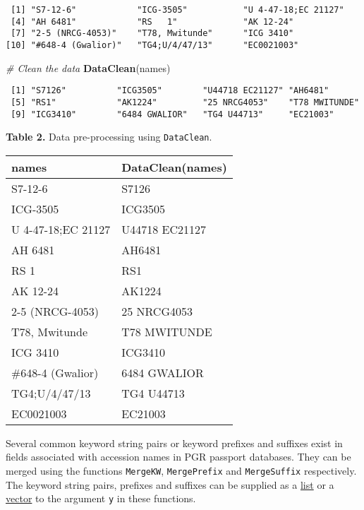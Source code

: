 \documentclass[
]{article}
\newenvironment{Shaded}{\begin{snugshade}}{\end{snugshade}}
\newcommand{\CommentTok}[1]{\textcolor[rgb]{0.56,0.35,0.01}{\textit{#1}}}
\newcommand{\KeywordTok}[1]{\textcolor[rgb]{0.13,0.29,0.53}{\textbf{#1}}}
\newcommand{\NormalTok}[1]{#1}
\begin{document}
\begin{verbatim}
 [1] "S7-12-6"            "ICG-3505"           "U 4-47-18;EC 21127"
 [4] "AH 6481"            "RS   1"             "AK 12-24"          
 [7] "2-5 (NRCG-4053)"    "T78, Mwitunde"      "ICG 3410"          
[10] "#648-4 (Gwalior)"   "TG4;U/4/47/13"      "EC0021003"         
\end{verbatim}

\begin{Shaded}
\begin{Highlighting}[]
\CommentTok{# Clean the data}
\KeywordTok{DataClean}\NormalTok{(names)}
\end{Highlighting}
\end{Shaded}

\begin{verbatim}
 [1] "S7126"          "ICG3505"        "U44718 EC21127" "AH6481"        
 [5] "RS1"            "AK1224"         "25 NRCG4053"    "T78 MWITUNDE"  
 [9] "ICG3410"        "6484 GWALIOR"   "TG4 U44713"     "EC21003"       
\end{verbatim}

\textbf{Table 2.} Data pre-processing using \texttt{DataClean}.

\begin{longtable}[]{@{}ll@{}}
\toprule
\textbf{names} & \textbf{DataClean(names)}\tabularnewline
\midrule
\endhead
S7-12-6 & S7126\tabularnewline
ICG-3505 & ICG3505\tabularnewline
U 4-47-18;EC 21127 & U44718 EC21127\tabularnewline
AH 6481 & AH6481\tabularnewline
RS 1 & RS1\tabularnewline
AK 12-24 & AK1224\tabularnewline
2-5 (NRCG-4053) & 25 NRCG4053\tabularnewline
T78, Mwitunde & T78 MWITUNDE\tabularnewline
ICG 3410 & ICG3410\tabularnewline
\#648-4 (Gwalior) & 6484 GWALIOR\tabularnewline
TG4;U/4/47/13 & TG4 U44713\tabularnewline
EC0021003 & EC21003\tabularnewline
\bottomrule
\end{longtable}

Several common keyword string pairs or keyword prefixes and suffixes
exist in fields associated with accession names in PGR passport
databases. They can be merged using the functions \texttt{MergeKW},
\texttt{MergePrefix} and \texttt{MergeSuffix} respectively. The keyword
string pairs, prefixes and suffixes can be supplied as a
\href{http://google.com/\#q=\%5BR\%5D+list}{list} or a
\href{http://google.com/\#q=\%5BR\%5D+vector}{vector} to the argument
\texttt{y} in these functions.
\end{document}
